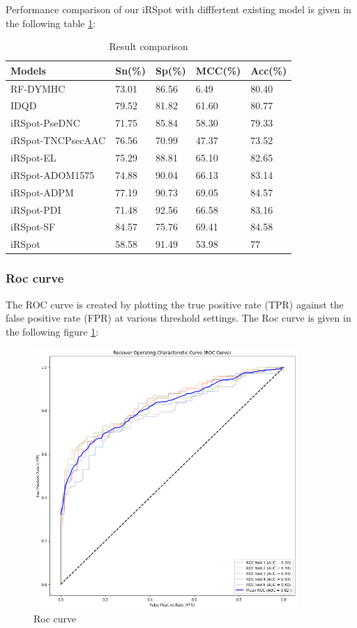 \documentclass[letterpaper, 10 pt, conference]{ieeeconf}  %
\begin{document}
Performance comparison of our iRSpot with difffertent existing model is given in the following table \ref{table_4}:
\begin{table}[ht]
\caption{Result comparison}
\label{table_4}
\begin{center}
\begin{tabular}{|p{1.8cm}|p{1cm}|p{1cm}|p{1cm}|p{1cm}|}
\hline
Models & Sn(\%) & Sp(\%) & MCC(\%) & Acc(\%) \\
\hline
RF-DYMHC & 73.01 & 86.56 & 6.49 & 80.40\\
\hline
IDQD & 79.52 & 81.82 & 61.60 & 80.77 \\
\hline
iRSpot-PseDNC & 71.75 & 85.84 & 58.30 & 79.33 \\
\hline
iRSpot-TNCPsecAAC & 76.56 & 70.99 & 47.37 & 73.52\\
\hline
iRSpot-EL & 75.29 & 88.81 & 65.10 & 82.65 \\
\hline
iRSpot-ADOM1575 & 74.88 & 90.04 & 66.13 & 83.14\\
\hline
iRSpot-ADPM & 77.19 & 90.73 & 69.05 & 84.57 \\
\hline
iRSpot-PDI & 71.48 & 92.56 & 66.58 & 83.16 \\
\hline
iRSpot-SF & 84.57 & 75.76 & 69.41 & 84.58 \\
\hline
iRSpot & 58.58 & 91.49 & 53.98 & 77\\ 
\hline

\end{tabular}
\end{center}
\end{table}

\subsubsection{Roc curve}
 The ROC curve is created by plotting the true positive rate (TPR) against the false positive rate (FPR) at various threshold settings. The Roc curve is given in the following figure \ref{fig:roc curve}:
 \begin{figure}[ht]
    \centering
    \includegraphics[width=10cm]{images/roc.png}
    \caption{Roc curve}
    \label{fig:roc curve}
\end{figure}
\end{document}
